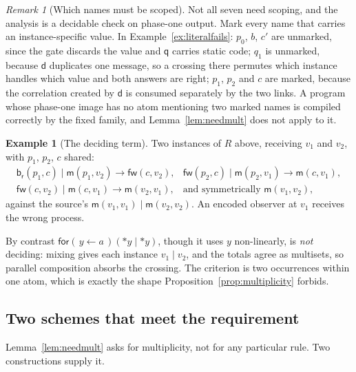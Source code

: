 \documentclass[11pt]{article}
\theoremstyle{plain}
\theoremstyle{definition}
\newtheorem{example}[theorem]{Example}
\theoremstyle{remark}
\newtheorem{remark}[theorem]{Remark}
\newcommand{\drp}[1]{{*}#1}
\newcommand{\inp}[3]{\mathsf{for}(\,#1 \leftarrow #2\,)#3}
\newcommand{\mm}{\mathsf{m}}
\newcommand{\dd}{\mathsf{d}}
\newcommand{\fw}{\mathsf{fw}}
\newcommand{\br}{\mathsf{b}_{\mathsf{r}}}
\newcommand{\qq}{\mathsf{q}}
\newcommand{\red}{\longrightarrow}
\begin{document}
\begin{remark}[Which names must be scoped]
\label{rem:scoping}
Not all seven need scoping, and the analysis is a decidable check on
phase-one output. Mark every name that carries an instance-specific value.
In Example~\ref{ex:literalfails}: $p_{0}$, $b$, $c'$ are unmarked, since the
gate discards the value and $\qq$ carries static code; $q_{1}$ is unmarked,
because $\dd$ duplicates one message, so a crossing there permutes which
instance handles which value and both answers are right; $p_{1}$, $p_{2}$ and
$c$ are marked, because the correlation created by $\dd$ is consumed
separately by the two links. A program whose phase-one image has no atom
mentioning two marked names is compiled correctly by the fixed family, and
Lemma~\ref{lem:needmult} does not apply to it.
\end{remark}

\begin{example}[The deciding term]
\label{ex:deciding}
Two instances of $R$ above, receiving $v_{1}$ and $v_{2}$, with $p_{1}$,
$p_{2}$, $c$ shared:
\[
\begin{array}{ll}
  \br(p_{1},c) \mid \mm(p_{1},v_{2}) \red \fw(c,v_{2}), &
  \fw(p_{2},c) \mid \mm(p_{2},v_{1}) \red \mm(c,v_{1}),\\
  \fw(c,v_{2}) \mid \mm(c,v_{1}) \red \mm(v_{2},v_{1}), &
  \text{and symmetrically } \mm(v_{1},v_{2}),
\end{array}
\]
against the source's $\mm(v_{1},v_{1}) \mid \mm(v_{2},v_{2})$. An encoded
observer at $v_{1}$ receives the wrong process.

By contrast $\inp{y}{a}{(\drp{y} \mid \drp{y})}$, though it uses $y$
non-linearly, is \emph{not} deciding: mixing gives each instance
$v_{1} \mid v_{2}$, and the totals agree as multisets, so parallel
composition absorbs the crossing. The criterion is two occurrences within one
atom, which is exactly the shape Proposition~\ref{prop:multiplicity} forbids.
\end{example}

\subsection{Two schemes that meet the requirement}
\label{sec:schemes}

Lemma~\ref{lem:needmult} asks for multiplicity, not for any particular rule.
Two constructions supply it.
\end{document}
